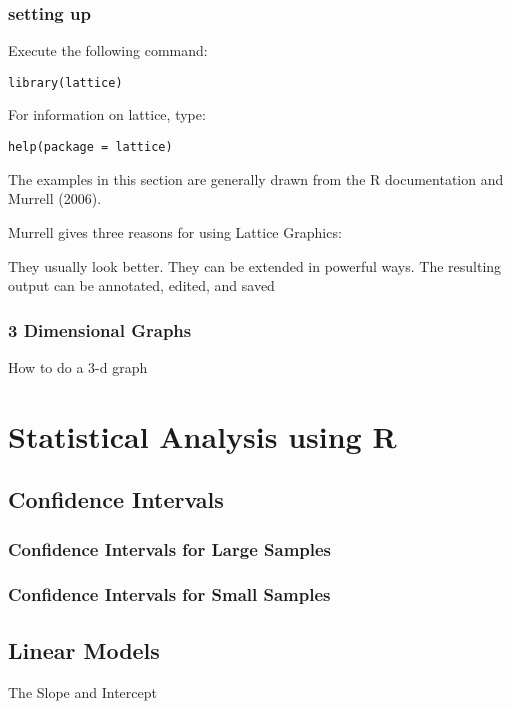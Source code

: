 \subsection{setting up}
Execute the following command:
\begin{framed}
\begin{verbatim}
library(lattice)
\end{verbatim}
\end{framed}
For information on lattice, type:
\begin{framed}
\begin{verbatim}
help(package = lattice)
\end{verbatim}
\end{framed}
The examples in this section are generally drawn from the R documentation and Murrell (2006).

Murrell gives three reasons for using Lattice Graphics:

They usually look better.
They can be extended in powerful ways.
The resulting output can be annotated, edited, and saved

\subsection{3 Dimensional Graphs}
How to do a 3-d graph

\newpage
\chapter{Statistical Analysis using R}
\section{Confidence Intervals}
\subsection{Confidence Intervals for Large Samples}
\subsection{Confidence Intervals for Small Samples}

\section{Linear Models}

The Slope and Intercept
\begin{framed}
\begin{verbatim}

\end{verbatim}
\end{framed}

